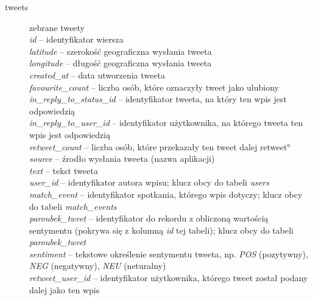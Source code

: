 \begin{description}
\item[tweets] zebrane tweety\\
\textit{id} -- identyfikator wiersza \\
\textit{latitude} -- szerokość geograficzna wysłania tweeta\\
\textit{longitude} -- długość geograficzna wysłania tweeta\\
\textit{created\_at} -- data utworzenia tweeta\\
\textit{favourite\_count} -- liczba osób, które oznaczyły tweet jako ulubiony\\
\textit{in\_reply\_to\_status\_id} -- identyfikator tweeta, na który ten wpis
jest odpowiedzią\\
\textit{in\_reply\_to\_user\_id} -- identyfikator użytkownika, na którego
tweeta ten wpis jest odpowiedzią\\
\textit{retweet\_count} -- liczba osób, które przekazały ten tweet dalej
\ang{retweet}\\
\textit{source} -- źrodło wysłania tweeta (nazwa aplikacji)\\
\textit{text} -- tekst tweeta\\
\textit{user\_id} -- identyfikator autora wpisu; klucz obcy do tabeli
\textit{users}\\
\textit{match\_event} -- identyfikator spotkania, którego wpis dotyczy; klucz
obcy do tabeli \textit{match\_events}\\
\textit{paroubek\_tweet} -- identyfikator do rekordu z obliczoną wartością
sentymentu (pokrywa się z kolumną \textit{id} tej tabeli); klucz obcy do tabeli
\textit{paroubek\_tweet}\\
\textit{sentiment} -- tekstowe określenie sentymentu tweeta, np. \textit{POS}
(pozytywny), \textit{NEG} (negatywny), \textit{NEU} (neturalny)\\
\textit{retweet\_user\_id} -- identyfikator użytkownika, którego tweet został
podany dalej jako ten wpis\\
 

\end{description}
